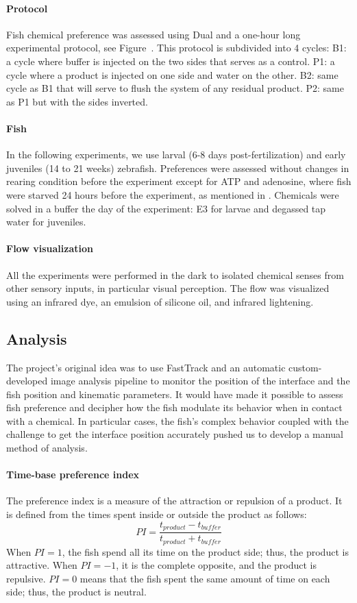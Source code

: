   \paragraph{Protocol} Fish chemical preference was assessed using Dual and a one-hour long experimental protocol, see Figure~{}. This protocol is subdivided into 4 cycles:
  B1: a cycle where buffer is injected on the two sides that serves as a control.
  P1: a cycle where a product is injected on one side and water on the other.
  B2: same cycle as B1 that will serve to flush the system of any residual product.
  P2: same as P1 but with the sides inverted.

  \paragraph{Fish} In the following experiments, we use larval (6-8 days post-fertilization) and early juveniles (14 to 21 weeks) zebrafish. Preferences were assessed without changes in rearing condition before the experiment except for ATP and adenosine, where fish were starved 24 hours before the experiment, as mentioned in \cite{}. Chemicals were solved in a buffer the day of the experiment: E3 \cite{} for larvae and degassed tap water for juveniles.

  \paragraph{Flow visualization} All the experiments were performed in the dark to isolated chemical senses from other sensory inputs, in particular visual perception. The flow was visualized using an infrared dye, an emulsion of silicone oil, and infrared lightening.

  \subsection{Analysis}
  The project's original idea was to use FastTrack and an automatic custom-developed image analysis pipeline to monitor the position of the interface and the fish position and kinematic parameters. It would have made it possible to assess fish preference and decipher how the fish modulate its behavior when in contact with a chemical. In particular cases, the fish's complex behavior coupled with the challenge to get the interface position accurately pushed us to develop a manual method of analysis.

  \paragraph{Time-base preference index} The preference index is a measure of the attraction or repulsion of a product. It is defined from the times spent inside or outside the product as follows:
  $$
  PI=\frac{t_{product}-t_{buffer}}{t_{product}+t_{buffer}}
  $$
  \noindent When $PI=1$, the fish spend all its time on the product side; thus, the product is attractive. When $PI=-1$, it is the complete opposite, and the product is repulsive. $PI=0$ means that the fish spent the same amount of time on each side; thus, the product is neutral.

